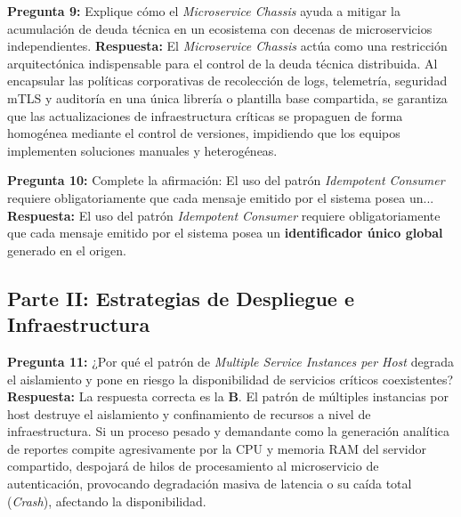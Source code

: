 \vspace{4mm}

\noindent\textbf{Pregunta 9:} Explique cómo el \textit{Microservice Chassis} ayuda a mitigar la acumulación de deuda técnica en un ecosistema con decenas de microservicios independientes.
\newline
\textbf{Respuesta:} El \textit{Microservice Chassis} actúa como una restricción arquitectónica indispensable para el control de la deuda técnica distribuida. Al encapsular las políticas corporativas de recolección de logs, telemetría, seguridad mTLS y auditoría en una única librería o plantilla base compartida, se garantiza que las actualizaciones de infraestructura críticas se propaguen de forma homogénea mediante el control de versiones, impidiendo que los equipos implementen soluciones manuales y heterogéneas.

\vspace{4mm}

\noindent\textbf{Pregunta 10:} Complete la afirmación: El uso del patrón \textit{Idempotent Consumer} requiere obligatoriamente que cada mensaje emitido por el sistema posea un...
\newline
\textbf{Respuesta:} El uso del patrón \textit{Idempotent Consumer} requiere obligatoriamente que cada mensaje emitido por el sistema posea un \textbf{identificador único global} generado en el origen.

\subsection*{Parte II: Estrategias de Despliegue e Infraestructura}

\noindent\textbf{Pregunta 11:} ¿Por qué el patrón de \textit{Multiple Service Instances per Host} degrada el aislamiento y pone en riesgo la disponibilidad de servicios críticos coexistentes?
\newline
\textbf{Respuesta:} La respuesta correcta es la \textbf{B}. El patrón de múltiples instancias por host destruye el aislamiento y confinamiento de recursos a nivel de infraestructura. Si un proceso pesado y demandante como la generación analítica de reportes compite agresivamente por la CPU y memoria RAM del servidor compartido, despojará de hilos de procesamiento al microservicio de autenticación, provocando degradación masiva de latencia o su caída total (\textit{Crash}), afectando la disponibilidad.

\vspace{4mm}

